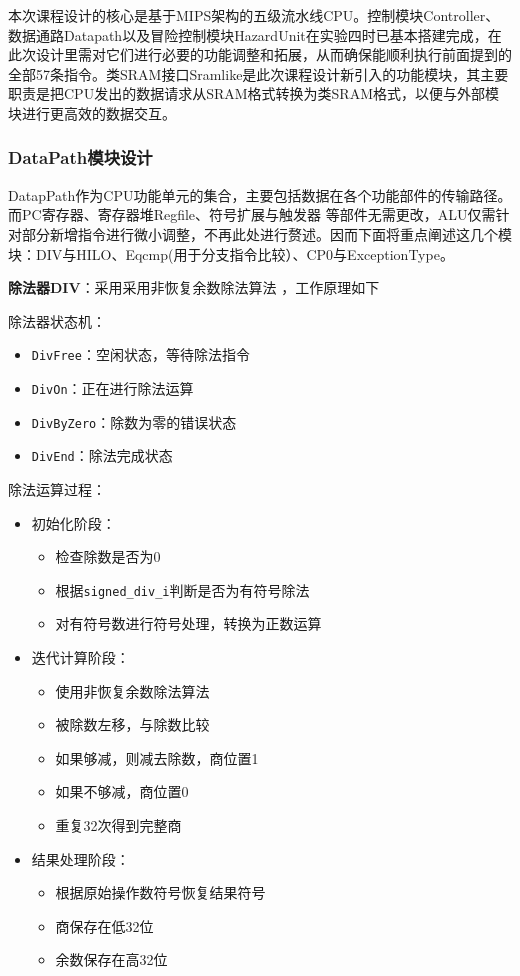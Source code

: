 本次课程设计的核心是基于MIPS架构的五级流水线CPU。控制模块Controller、数据通路Datapath以及冒险控制模块HazardUnit在实验四时已基本搭建完成，在此次设计里需对它们进行必要的功能调整和拓展，从而确保能顺利执行前面提到的全部57条指令。类SRAM接口Sramlike是此次课程设计新引入的功能模块，其主要职责是把CPU发出的数据请求从SRAM格式转换为类SRAM格式，以便与外部模块进行更高效的数据交互。

\subsubsection{DataPath模块设计}
DatapPath作为CPU功能单元的集合，主要包括数据在各个功能部件的传输路径。而PC寄存器、寄存器堆Regfile、符号扩展与触发器 等部件无需更改，ALU仅需针对部分新增指令进行微小调整，不再此处进行赘述。因而下面将重点阐述这几个模块：DIV与HILO、Eqcmp(用于分支指令比较）、CP0与ExceptionType。

\textbf{除法器DIV}：采用采用非恢复余数除法算法 ，工作原理如下

除法器状态机：
\begin{itemize}
\item \verb|DivFree|：空闲状态，等待除法指令
\item \verb|DivOn|：正在进行除法运算
\item \verb|DivByZero|：除数为零的错误状态
\item \verb|DivEnd|：除法完成状态
\end{itemize}
除法运算过程：
\begin{itemize}
\item 初始化阶段：
\begin{itemize}
	\item 检查除数是否为0
	\item 根据\verb|signed_div_i|判断是否为有符号除法
	\item 对有符号数进行符号处理，转换为正数运算
\end{itemize}
\item 迭代计算阶段：
\begin{itemize}
	\item 使用非恢复余数除法算法
	\item 被除数左移，与除数比较
	\item 如果够减，则减去除数，商位置1
	\item 如果不够减，商位置0
	\item 重复32次得到完整商
\end{itemize}
\item 结果处理阶段：
\begin{itemize}
	\item 根据原始操作数符号恢复结果符号
	\item 商保存在低32位
	\item 余数保存在高32位
\end{itemize}
\end{itemize}

